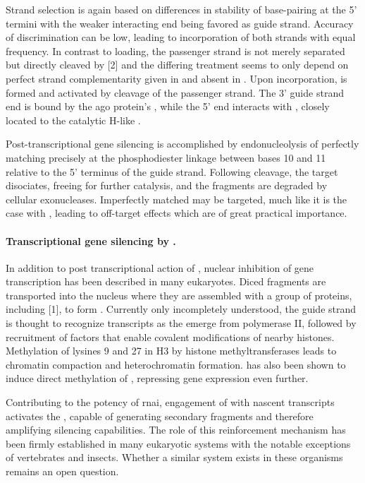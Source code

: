 Strand selection is again based on differences in stability of base-pairing at the 5' termini with the weaker interacting end being favored as guide strand. Accuracy of discrimination can be low, leading to incorporation of both strands with equal frequency. In contrast to  loading, the passenger strand is not merely separated but directly cleaved by [2] and the differing treatment seems to only depend on perfect strand complementarity given in  and absent in . Upon  incorporation,  is formed and activated by cleavage of the passenger strand. The 3' guide strand end is bound by the \acrshort{ago} protein's , while the 5' end interacts with , closely located to the catalytic  H-like .

Post-transcriptional gene silencing is accomplished by endonucleolysis of perfectly matching  precisely at the phosphodiester linkage between bases 10 and 11 relative to the 5' terminus of the  guide strand. Following cleavage, the target disociates, freeing  for further catalysis, and the  fragments are degraded by cellular exonucleases. Imperfectly matched  may be targeted, much like it is the case with , leading to  off-target effects which are of great practical importance.

\paragraph{Transcriptional gene silencing by .}
In addition to post transcriptional action of , nuclear inhibition of gene transcription has been described in many eukaryotes. Diced  fragments are transported into the nucleus where they are assembled with a group of proteins, including [1], to form . Currently only incompletely understood, the  guide strand is thought to recognize  transcripts as the emerge from  polymerase II, followed by recruitment of factors that enable covalent modifications of nearby histones. Methylation of lysines 9 and 27 in H3 by histone methyltransferases leads to chromatin compaction and heterochromatin formation.  has also been shown to induce direct methylation of , repressing gene expression even further.

Contributing to the potency of \acrlong{rnai}, engagement of  with nascent transcripts activates the , capable of generating secondary  fragments and therefore amplifying silencing capabilities. The role of this reinforcement mechanism has been firmly established in many eukaryotic  systems with the notable exceptions of vertebrates and insects. Whether a similar system exists in these organisms remains an open question.

